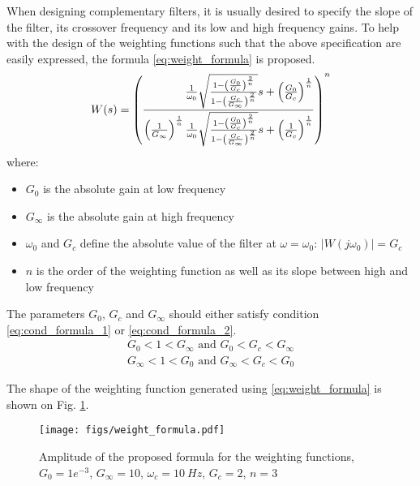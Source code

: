 \documentclass[letterpaper, 10 pt, conference]{ieeeconf}
\begin{document}
When designing complementary filters, it is usually desired to specify the slope of the filter, its crossover frequency and its low and high frequency gains.
To help with the design of the weighting functions such that the above specification are easily expressed, the formula \eqref{eq:weight_formula} is proposed.
\begin{equation}
\label{eq:weight_formula}
  W(s) = \left( \frac{
           \hfill{} \frac{1}{\omega_0} \sqrt{\frac{1 - \left(\frac{G_0}{G_c}\right)^{\frac{2}{n}}}{1 - \left(\frac{G_c}{G_\infty}\right)^{\frac{2}{n}}}} s + \left(\frac{G_0}{G_c}\right)^{\frac{1}{n}}
         }{
           \left(\frac{1}{G_\infty}\right)^{\frac{1}{n}} \frac{1}{\omega_0} \sqrt{\frac{1 - \left(\frac{G_0}{G_c}\right)^{\frac{2}{n}}}{1 - \left(\frac{G_c}{G_\infty}\right)^{\frac{2}{n}}}} s + \left(\frac{1}{G_c}\right)^{\frac{1}{n}}
         }\right)^n
\end{equation}
where:
\begin{itemize}
\item \(G_0\) is the absolute gain at low frequency
\item \(G_\infty\) is the absolute gain at high frequency
\item \(\omega_0\) and \(G_c\) define the absolute value of the filter at \(\omega = \omega_0\): \(|W(j\omega_0)| = G_c\)
\item \(n\) is the order of the weighting function as well as its slope between high and low frequency
\end{itemize}

The parameters \(G_0\), \(G_c\) and \(G_\infty\) should either satisfy condition \eqref{eq:cond_formula_1} or \eqref{eq:cond_formula_2}.
\begin{subequations}
\label{eq:condition_params_formula}
  \begin{align}
    G_0 < 1 < G_\infty \text{ and } G_0 < G_c < G_\infty \label{eq:cond_formula_1}\\
    G_\infty < 1 < G_0 \text{ and } G_\infty < G_c < G_0 \label{eq:cond_formula_2}
  \end{align}
\end{subequations}

The shape of the weighting function generated using \eqref{eq:weight_formula} is shown on Fig. \ref{fig:weight_formula}.

\begin{figure}[htbp]
\centering
\texttt{[image: figs/weight\_formula.pdf]}
\caption{\label{fig:weight_formula}
Amplitude of the proposed formula for the weighting functions, \(G_0 = 1e^{-3}\), \(G_\infty = 10\), \(\omega_c = \SI{10}{Hz}\), \(G_c = 2\), \(n = 3\)}
\end{figure}
\end{document}
